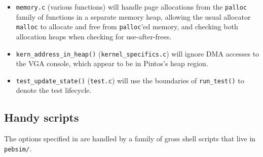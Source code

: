 \begin{itemize}
	\item {\tt memory.c} (various functions)
		will handle page allocations from the {\tt palloc} family of functions in a separate memory heap,
		allowing the usual allocator {\tt malloc} to allocate and free from {\tt palloc}'ed memory,
		and checking both allocation heaps when checking for use-after-frees.
	\item {\tt kern\_address\_in\_heap()} ({\tt kernel\_specifics.c})
		will ignore DMA accesses to the VGA console,
		which appear to be in Pintos's heap region.
	\item {\tt test\_update\_state()} ({\tt test.c})
		will use the boundaries of {\tt run\_test()} to denote the test lifecycle.
\end{itemize}


\subsection{Handy scripts}
\label{sec:landslide-glue}

The options specified in \sect{\ref{sec:landslide-directly}}
are handled by a family of gross shell scripts that live in {\tt pebsim/}.

